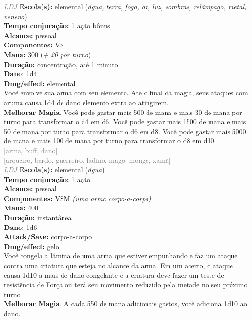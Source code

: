\documentclass{RPG_Adventure}[2021/10/20]
\begin{document}
{\tiny \textcolor{gray}{\textit{LDJ}}}\jump{}
{\small \t \textbf{Escola(s):} elemental (\textit{água, terra, fogo, ar, luz, sombras, relâmpago, metal, veneno})\\\t \textbf{Tempo conjuração:} 1 ação bônus\\\t \textbf{Alcance:} pessoal\\\t \textbf{Componentes:} VS\\\t \textbf{Mana:} 300 (\textit{+ 20 por turno})\\\t \textbf{Duração:} concentração, até 1 minuto\\\t \textbf{Dano}: 1d4\\\t \textbf{Dmg/effect:} elemental\\}
{\normalsize Você envolve sua arma com seu elemento. Até o final da magia, seus ataques com aruma causa 1d4 de dano elemento extra ao atingirem.\\\t \textbf{Melhorar Magia}. Você pode gastar mais 500 de mana e mais 30 de mana por turno para transformar o d4 em d6. Você pode gastar mais 1500 de mana e mais 50 de mana por turno para transformar o d6 em d8. Você pode gastar mais 5000 de mana e mais 100 de mana por turno para transformar o d8 em d10.\\}
{\scriptsize \textcolor{gray}{[arma, buff, dano]\\}}
{\scriptsize \textcolor{gray}{[arqueiro, bardo, guerreiro, ladino, mago, monge, xamã]\\}}
{\tiny \textcolor{gray}{\textit{LDJ}}}\jump{}
{\small \t \textbf{Escola(s):} elemental (\textit{água})\\\t \textbf{Tempo conjuração:} 1 ação\\\t \textbf{Alcance:} pessoal\\\t \textbf{Componentes:} VSM \textit{(uma arma corpo-a-corpo)}\\\t \textbf{Mana:} 400\\\t \textbf{Duração:} instantânea\\\t \textbf{Dano}: 1d6\\\t \textbf{Attack/Save:} corpo-a-corpo\\\t \textbf{Dmg/effect:} gelo\\}
{\normalsize Você congela a lâmina de uma arma que estiver empunhando e faz um ataque contra uma criatura que esteja no alcance da arma. Em um acerto, o ataque causa 1d10 a mais de dano congelante e a criatura deve fazer um teste de resistência de Força ou terá seu movimento reduzido pela metade no seu próximo turno.\\\t \textbf{Melhorar Magia}. A cada 550 de mana adicionais gastos, você adiciona 1d10 ao dano.\\}
\end{document}
